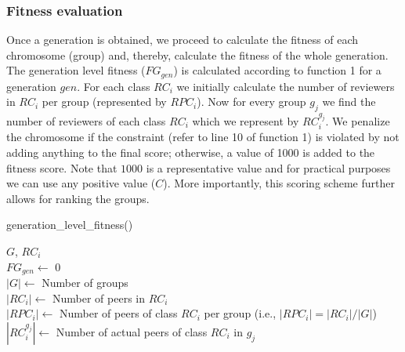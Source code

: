 \subsubsection*{Fitness evaluation}
Once a generation is obtained, we proceed to calculate the fitness of each chromosome (group) and, thereby, calculate the fitness of the whole generation. 
The generation level fitness ($FG_{gen}$) is calculated according to function 1 for a generation $gen$. For each class $RC_i$ we initially calculate the number of reviewers in $RC_i$ 
per group (represented by $RPC_i$). Now for every group $g_j$ we find the number of reviewers of each class $RC_i$  which we represent by $RC_{i}^{g_j}$. We penalize the 
chromosome if the constraint (refer to line 10 of function 1) is violated by not adding anything to the final score; otherwise, a value of 1000 is added to the fitness score.
Note that $1000$ is a representative value and for practical purposes we can use any positive value ($C$). 
More importantly, this scoring scheme further allows for ranking the groups. 
\begin{function1}
 \caption{generation\_level\_fitness()}
 $G$, $RC_i$ \\ 
 $FG_{gen} \leftarrow$ 0\\
 $|G|\leftarrow$ Number of groups\\
 $|RC_i|\leftarrow$ Number of peers in $RC_i$\\
 $|RPC_i|\leftarrow$ Number of peers of class $RC_i$ per group (i.e., $|RPC_i| = |RC_i|/|G|$) \\
 $|RC_{i}^{g_j}|\leftarrow$ Number of actual peers of class $RC_{i}$ in $g_j$\\
\end{function1}



